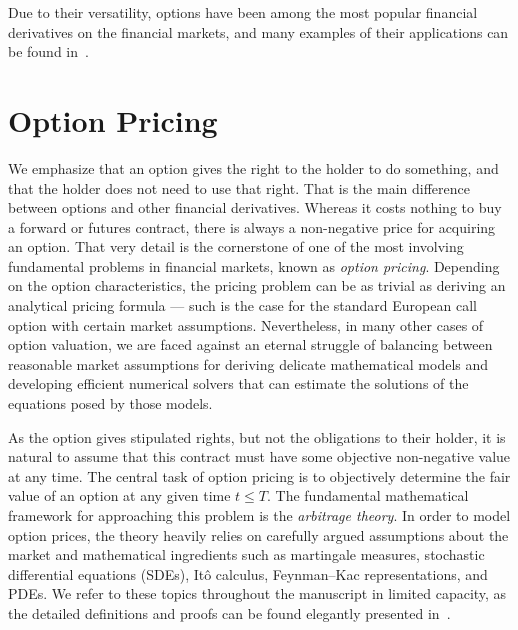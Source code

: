 \documentclass{UUThesisTemplate}
\begin{document}
\par
Due to their versatility, options have been among the most popular financial derivatives on the financial markets, and many examples of their applications can be found in~\cite{hull2017options}.
%
%





%
\chapter{Option Pricing}
\label{ch:optionpricing}

\par
We emphasize that an option gives the right to the holder to do something, and that the holder does not need to use that right. That is the main difference between options and other financial derivatives. Whereas it costs nothing to buy a forward or futures contract, there is always a non-negative price for acquiring an option. That very detail is the cornerstone of one of the most involving fundamental problems in financial markets, known as \emph{option pricing}. Depending on the option characteristics, the pricing problem can be as trivial as deriving an analytical pricing formula --- such is the case for the standard European call option with certain market assumptions. Nevertheless, in many other cases of option valuation, we are faced against an eternal struggle of balancing between reasonable market assumptions for deriving delicate mathematical models and developing efficient numerical solvers that can estimate the solutions of the equations posed by those models.

\par
As the option gives stipulated rights, but not the obligations to their holder, it is natural to assume that this contract must have some objective non-negative value at any time. The central task of option pricing is to objectively determine the fair value of an option at any given time $t \leq T$. The fundamental mathematical framework for approaching this problem is the \emph{arbitrage theory}. In order to model option prices, the theory heavily relies on carefully argued assumptions about the market and mathematical ingredients such as martingale measures, stochastic differential equations (SDEs), It\^o calculus, Feynman--Kac representations, and PDEs. We refer to these topics throughout the manuscript in limited capacity, as the detailed definitions and proofs can be found elegantly presented in~\cite{bjork2009arbitrage}.
%
\end{document}
